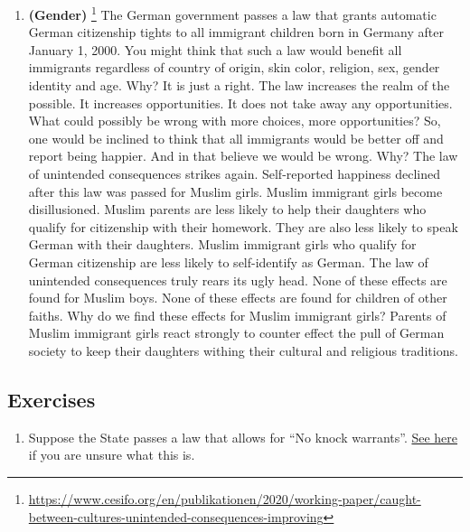 \documentclass[
]{book}
\providecommand{\tightlist}{%
  \setlength{\itemsep}{0pt}\setlength{\parskip}{0pt}}
\begin{document}
\begin{enumerate}
\def\labelenumi{\arabic{enumi}.}
\setcounter{enumi}{6}
\tightlist
\item
  \textbf{(Gender)} \footnote{\url{https://www.cesifo.org/en/publikationen/2020/working-paper/caught-between-cultures-unintended-consequences-improving}} The German government passes a law that grants automatic German citizenship tights to all immigrant children born in Germany after January 1, 2000. You might think that such a law would benefit all immigrants regardless of country of origin, skin color, religion, sex, gender identity and age. Why? It is just a right. The law increases the realm of the possible. It increases opportunities. It does not take away any opportunities. What could possibly be wrong with more choices, more opportunities? So, one would be inclined to think that all immigrants would be better off and report being happier. And in that believe we would be wrong. Why? The law of unintended consequences strikes again.
  Self-reported happiness declined after this law was passed for Muslim girls. Muslim immigrant girls become disillusioned. Muslim parents are less likely to help their daughters who qualify for citizenship with their homework. They are also less likely to speak German with their daughters. Muslim immigrant girls who qualify for German citizenship are less likely to self-identify as German.
  The law of unintended consequences truly rears its ugly head.
  None of these effects are found for Muslim boys. None of these effects are found for children of other faiths.
  Why do we find these effects for Muslim immigrant girls? Parents of Muslim immigrant girls react strongly to counter effect the pull of German society to keep their daughters withing their cultural and religious traditions.
\end{enumerate}

\hypertarget{exercises}{%
\subsection{Exercises}\label{exercises}}

\begin{enumerate}
\def\labelenumi{\arabic{enumi}.}
\tightlist
\item
  Suppose the State passes a law that allows for ``No knock warrants''. \href{https://en.wikipedia.org/wiki/No-knock_warrant\#:~:text=In\%20the\%20United\%20States\%2C\%20a,knocking\%20or\%20ringing\%20a\%20doorbell}{See here} if you are unsure what this is.
\end{enumerate}
\end{document}
